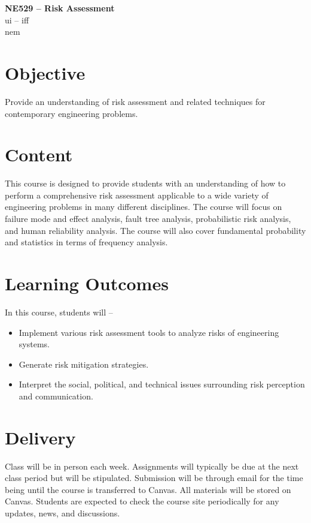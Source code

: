 \documentclass[11pt,letterpaper]{article}
\newcommand{\acl}{\acrlong} %
\begin{document}
{\centering 
    \textbf{NE529 -- Risk Assessment\\
    }
    \acl{ui} -- \acl{iff}\\
    \acl{nem}
\par
}

\noindent\makebox[\linewidth]{\rule{\textwidth}{0.5pt}} %


\section{Objective}
Provide an understanding of risk assessment and related techniques for contemporary engineering problems.


\section{Content}
This course is designed to provide students with an understanding of how to perform a comprehensive risk assessment applicable to a wide variety of engineering problems in many different disciplines. The course will focus on failure mode and effect analysis, fault tree analysis, probabilistic risk analysis, and human reliability analysis. The course will also cover fundamental probability and statistics in terms of frequency analysis. 

\section{Learning Outcomes}
In this course, students will --
\begin{itemize}
    \item Implement various risk assessment tools to analyze risks of engineering systems.
    \item Generate risk mitigation strategies. 
    \item Interpret the social, political, and technical issues surrounding risk perception and communication. 
\end{itemize}


\section{Delivery}
Class will be in person each week. Assignments will typically be due at the next class period but will be stipulated. Submission will be through email for the time being until the course is transferred to Canvas. All materials will be stored on Canvas. Students are expected to check the course site periodically for any updates, news, and discussions. 
\end{document}
